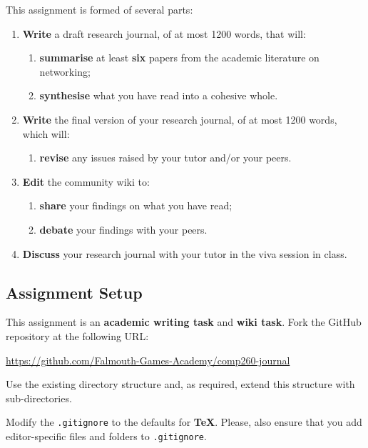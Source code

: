 \documentclass{../fal_assignment}
\begin{document}
This assignment is formed of several parts:

\begin{enumerate}[label=(\Alph*)]
    \item \textbf{Write} a draft research journal, of at most 1200 words, that will:
    	\begin{enumerate}[label=(\roman*)]
    		\item \textbf{summarise} at least \textbf{six} papers from the academic literature on networking;
    		\item \textbf{synthesise} what you have read into a cohesive whole.
    	\end{enumerate}
    \item \textbf{Write} the final version of your research journal, of at most 1200 words, which will:
    	\begin{enumerate}[label=(\roman*)]
    		\item \textbf{revise} any issues raised by your tutor and/or your peers.
    	\end{enumerate}
    \item \textbf{Edit} the community wiki to:
    	\begin{enumerate}[label=(\roman*)]
    		\item \textbf{share} your findings on what you have read;
    		\item \textbf{debate} your findings with your peers.
    	\end{enumerate}
    \item \textbf{Discuss} your research journal with your tutor in the viva session in class.
\end{enumerate}

\subsection*{Assignment Setup}

This assignment is an \textbf{academic writing task} and \textbf{wiki task}. Fork the GitHub repository at the following URL:

\indent \url{https://github.com/Falmouth-Games-Academy/comp260-journal}

Use the existing directory structure and, as required, extend this structure with sub-directories.

Modify the \texttt{.gitignore} to the defaults for \textbf{TeX}. Please, also ensure that you add editor-specific files and folders to \texttt{.gitignore}. 
\end{document}

